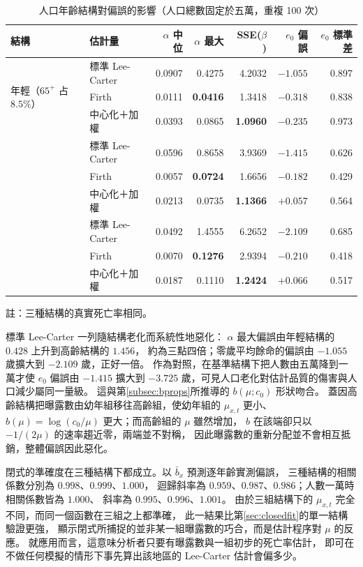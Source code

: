 \documentclass[UTF8, fontset=macnew, a4paper, 12pt]{ctexart}
\begin{document}
\begin{table}[H]
\centering
\caption{人口年齡結構對偏誤的影響（人口總數固定於五萬，重複 100 次）}
\small
\renewcommand{\arraystretch}{1.15}
\begin{tabular}{llrrrrr}
\toprule
結構 & 估計量 & $\alpha$ 中位 & $\alpha$ 最大 & SSE($\beta$) & $e_0$ 偏誤 & $e_0$ 標準差\\
\midrule
\multirow{3}{*}{年輕（$65^{+}$ 占 $8.5\%$）}
 & 標準 Lee-Carter      & 0.0907 & 0.4275 & 4.2032 & $-1.055$ & 0.897\\
 & Firth        & 0.0111 & \textbf{0.0416} & 1.3418 & $-0.318$ & 0.838\\
 & 中心化＋加權 & 0.0393 & 0.0865 & \textbf{1.0960} & \textbf{$-0.235$} & 0.973\\
\addlinespace
\multirow{3}{*}{基準（$20.3\%$）}
 & 標準 Lee-Carter      & 0.0596 & 0.8658 & 3.9369 & $-1.415$ & 0.626\\
 & Firth        & 0.0057 & \textbf{0.0724} & 1.6656 & $-0.182$ & 0.429\\
 & 中心化＋加權 & 0.0213 & 0.0735 & \textbf{1.1366} & \textbf{$+0.057$} & 0.564\\
\addlinespace
\multirow{3}{*}{高齡（$31.7\%$）}
 & 標準 Lee-Carter      & 0.0492 & 1.4555 & 6.2652 & $-2.109$ & 0.685\\
 & Firth        & 0.0070 & \textbf{0.1276} & 2.9394 & $-0.210$ & 0.418\\
 & 中心化＋加權 & 0.0187 & 0.1110 & \textbf{1.2424} & \textbf{$+0.066$} & 0.517\\
\bottomrule
\end{tabular}

{\footnotesize 註：三種結構的真實死亡率相同。}

\label{tab:popstr}
\end{table}

標準 Lee-Carter 一列隨結構老化而系統性地惡化：
$\alpha$ 最大偏誤由年輕結構的 $0.428$ 上升到高齡結構的 $1.456$，
約為三點四倍；零歲平均餘命的偏誤由 $-1.055$ 歲擴大到 $-2.109$ 歲，正好一倍。
作為對照，在基準結構下把人數由五萬降到一萬才使 $e_0$ 偏誤由 $-1.415$
擴大到 $-3.725$ 歲，可見人口老化對估計品質的傷害與人口減少屬同一量級。
這與第\ref{subsec:bprops}所推導的 $b(\mu;c_0)$ 形狀吻合。
蓋因高齡結構把曝露數由幼年組移往高齡組，使幼年組的 $\mu_{x,t}$ 更小、
$b(\mu)=\log(c_0/\mu)$ 更大；而高齡組的 $\mu$ 雖然增加，
$b$ 在該端卻只以 $-1/(2\mu)$ 的速率趨近零，兩端並不對稱，
因此曝露數的重新分配並不會相互抵銷，整體偏誤因此惡化。

閉式的準確度在三種結構下都成立。以 $\bar b_x$ 預測逐年齡實測偏誤，
三種結構的相關係數分別為 $0.998$、$0.999$、$1.000$，
迴歸斜率為 $0.959$、$0.987$、$0.986$；人數一萬時相關係數皆為 $1.000$、
斜率為 $0.995$、$0.996$、$1.001$。
由於三組結構下的 $\mu_{x,t}$ 完全不同，而同一個函數在三組之上都準確，
此一結果比第\ref{sec:closedfit}的單一結構驗證更強，
顯示閉式所捕捉的並非某一組曝露數的巧合，而是估計程序對 $\mu$ 的反應。
就應用而言，這意味分析者只要有曝露數與一組初步的死亡率估計，
即可在不做任何模擬的情形下事先算出該地區的 Lee-Carter 估計會偏多少。
\end{document}
